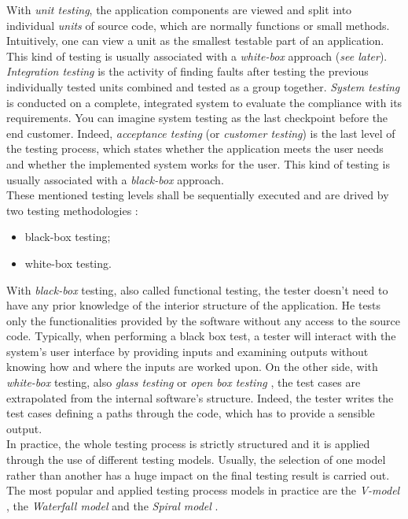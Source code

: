 With \textit{unit testing}, the application components are viewed and split into  individual \textit{units} of source code, which are normally functions or small methods. Intuitively, one can view a unit as the smallest testable part of an application. This kind of testing is usually associated with a \textit{white-box} approach (\textit{see later}).  \textit{Integration testing} is the activity of finding faults after testing the previous individually tested units combined and tested as a group together. \textit{System testing} is conducted on a complete, integrated system to evaluate the compliance with its requirements. You can imagine system testing as the last checkpoint before the end customer. Indeed, \textit{acceptance testing} (or \textit{customer testing}) is the last level of the testing process, which states whether the application meets the user needs and whether the implemented system works for the user. This kind of testing is usually associated with a \textit{black-box} approach. 
\\
These mentioned testing levels shall be sequentially executed and are drived by two testing methodologies \cite{white-box, black-box}: 
\begin{itemize}
\item black-box testing;
\item white-box testing.
\end{itemize} 
With \textit{black-box} testing, also called functional testing, the tester doesn't need to have any prior knowledge of the interior structure of the application. He tests only the functionalities provided by the software without any access to the source code. Typically, when performing a black box test, a tester will interact with the system's user interface by providing inputs and examining outputs without knowing how and where the inputs are worked upon. On the other side, with \textit{white-box} testing, also \textit{glass testing} or \textit{open box testing} \cite{grano}, the test cases are extrapolated from the internal software's structure. Indeed, the tester writes the test cases defining a paths through the code, which has to provide a sensible output. \\
In practice, the whole testing process is strictly structured and it is applied through the use of different testing models. Usually, the selection of one model rather than another has a huge impact on the final testing result is carried out. The most popular and applied testing process models in practice are the \textit{V-model} \cite{vmodel}, the \textit{Waterfall model}\cite{waterfallmodel} and the \textit{Spiral model} \cite{spiralmodel}. \\
